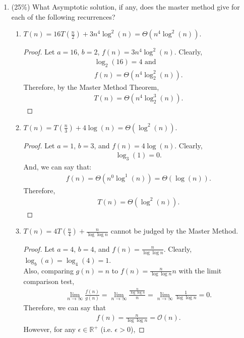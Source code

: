 \documentclass[11pt]{article}
\begin{document}
\begin{enumerate}
\item (25\%)  What Asymptotic solution, if any, does the master method give  for each of the following recurrences?
\\
\begin{enumerate}
\item $T(n) = 16T(\frac{n}{2}) + 3n^4\log^2(n) = \Theta(n^4 \log^2(n))$.
\begin{proof}
Let $a = 16$, $b = 2$, $f(n) = 3n^4 \log^2(n)$.  Clearly, 
\begin{align*}
\log_2(16) = 4 \text{ and } \\
f(n) = \Theta(n^4 \log_2^2(n)).
\end{align*}  Therefore, by the Master Method Theorem, 
\begin{align*}
T(n) = \Theta(n^4 \log_2^3(n)).
\end{align*}
\end{proof}
\item $T(n) = T(\frac{n}{3}) + 4 \log(n) = \Theta( \log^2(n))$.
\begin{proof}
Let $a = 1$, $b = 3$, and $f(n) = 4 \log(n)$.  Clearly,
\begin{align*}
\log_3(1) = 0.
\end{align*}
And, we can say that:
\begin{align*}
f(n) = \Theta(n^0 \log^1(n))= \Theta( \log(n)).
\end{align*}
Therefore,
\begin{align*}
T(n) = \Theta(\log^2(n)).
\end{align*}
\end{proof}
\item $T(n) = 4T(\frac{n}{4}) + \frac{n}{\log \log n}$ cannot be judged by the Master Method.
\begin{proof}
Let $a = 4$, $b=4$, and $f(n) = \frac{n}{\log \log n}$.  Clearly, $\log_b(a) = \log_4(4) = 1$.  \\
Also, comparing $g(n)=n$ to $f(n)=\frac{n}{\log \log n}{n}$ with the limit comparison test, 
\begin{align*}
\lim_{n \to \infty}\frac{f(n)}{g(n)}=\lim_{n \to \infty} \frac{\frac{n}{\log \log n}}{n} = \lim_{n \to \infty} \frac{1}{\log \log n} = 0.
\end{align*}
Therefore, we can say that
\begin{align*}
f(n) = \frac{n}{\log \log n}  =\mathcal{O}(n).
\end{align*}
However, for any $\epsilon \in \mathbb{R^+}$ (i.e. $\epsilon>0$),

\end{proof}
\end{enumerate}
\end{enumerate}
\end{document}
